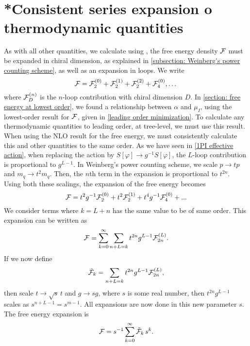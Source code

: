 \section{*Consistent series expansion o thermodynamic quantities}
\label{appendix: consisten expansion}

As with all other quantities, we calculate using \chpt, the free energy density $\mathcal{F}$ must be expanded in chiral dimension, as explained in \autoref{subsection: Weinberg's power counting scheme}, as well as an expansion in loops.
We write 
%
\begin{equation}
    \mathcal{F} = \mathcal{F}^{(0)}_2 + \mathcal{F}^{(1)}_2 + \mathcal{F}^{(2)}_2 + \mathcal{F}^{(0)}_4,\dots
\end{equation}
%
where $\mathcal{F}^{(n)}_D$ is the $n$-loop contribution with chiral dimension $D$.
In \autoref{section: free energy at lowest order}, we found a relationship between $\alpha$ and $\mu_I$, using the lowest-order result for $\mathcal{F}$, given in \autoref{leading order minimization}.
To calculate any thermodynamic quantities to leading order, at tree-level, we must use this result.
When using the NLO result for the free energy, we must consistently calculate this and other quantities to the same order.
As we have seen in \autoref{1PI effective action}, when replacing the action by $S[\varphi] \rightarrow g^{-1}S[\varphi]$, the $L$-loop contribution is proportional to $g^{L-1}$.
In Weinberg's power counting scheme, we scale $p \rightarrow t p$ and $m_q \rightarrow t^2 m_q$.
Then, the $n$th term in the expansion is proportional to $t^{2n}$.
Using both these scalings, the expansion of the free energy becomes
%
\begin{equation}
    \mathcal{F} = t^2 g^{-1} \mathcal{F}_2^{(0)} + t^2 \mathcal{F}_2^{(1)} + t^4 g^{-1} \mathcal{F}_4^{(0)}
    + ...
\end{equation}
%
We consider terms where $k = L + n$ has the same value to be of same order.
This expansion can be written as
\begin{equation}
    \mathcal{F} = \sum_{k=0}^\infty \sum_{n+L=k} t^{2n} g^{L-1} \mathcal{F}_{2n}^{(L)}.
\end{equation}
%
If we now define
\begin{equation}
    \tilde {\mathcal{F}}_k = \sum_{n+L=k} t^{2n} g^{L-1} \mathcal{F}_{2n}^{(L)},
\end{equation}
%
then scale $t \rightarrow \sqrt{s} \, t$ and $g \rightarrow s g$, where $s$ is some real number, then $t^{2n}g^{L-1}$ scales as $s^{n+L-1} = s^{m-1}$.
All expansions are now done in this new parameter $s$.
The free energy expansion is
\begin{equation}
    \mathcal{F} = s^{-1}\sum_{k = 0}^\infty \tilde {\mathcal{F}}_k \, s^{k}.
\end{equation}
